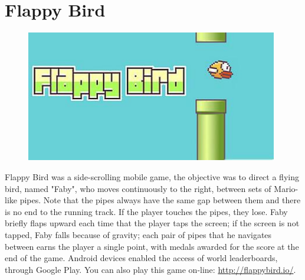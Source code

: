 \documentclass[a4paper, 11pt]{article}
\begin{document}
\section{Flappy Bird}
\begin{figure}[ht]
\centering
\includegraphics[width=11cm]{Pic/bird}
\end{figure}
Flappy Bird was a side-scrolling mobile game, the objective was to direct a flying bird, named "Faby", who moves continuously to the right, between sets of Mario-like pipes. Note that the pipes always have the same gap between them and there is no end to the running track. If the player touches the pipes, they lose. Faby briefly flaps upward each time that the player taps the screen; if the screen is not tapped, Faby falls because of gravity; each pair of pipes that he navigates between earns the player a single point, with medals awarded for the score at the end of the game. Android devices enabled the access of world leaderboards, through Google Play. You can also play this game on-line: \url{http://flappybird.io/}.
\end{document}
